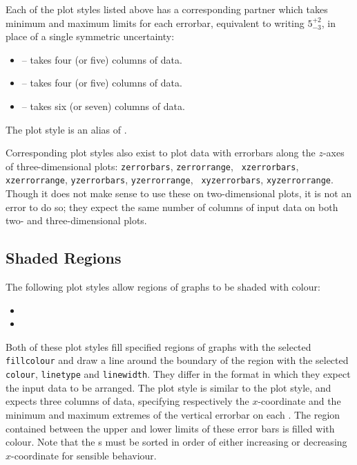 Each of the plot styles listed above has a corresponding partner which takes
minimum and maximum limits for each errorbar, equivalent to writing
$5^{+2}_{-3}$, in place of a single symmetric uncertainty:
\begin{itemize}
\item {} -- takes four (or five) columns of data.
\item {} -- takes four (or five) columns of data.
\item {} -- takes six (or seven) columns of data.
\end{itemize}
The plot style  is an alias of .

Corresponding plot styles also exist to plot data with errorbars along the
$z$-axes of three-dimensional plots: {\tt zerrorbars}, {\tt zerrorrange}, {\tt
xzerrorbars}, {\tt xzerrorrange}, {\tt yzerrorbars}, {\tt yzerrorrange}, {\tt
xyzerrorbars}, {\tt xyzerrorrange}. Though it does not make sense to use these
on two-dimensional plots, it is not an error to do so; they expect the same
number of columns of input data on both two- and three-dimensional plots.

\subsection{Shaded Regions}

The following plot styles allow regions of graphs to be shaded with colour:

\begin{itemize}
\item {}
\item {}
\end{itemize}

Both of these plot styles fill specified regions of graphs with the selected
{\tt fillcolour} and draw a line around the boundary of the region with the
selected {\tt colour}, {\tt linetype} and {\tt linewidth}. They differ in the
format in which they expect the input data to be arranged. The
 plot style is similar to the  plot
style, and expects three columns of data, specifying respectively the
$x$-coordinate and the minimum and maximum extremes of the vertical errorbar on
each \datapoint.  The region contained between the upper and lower limits of
these error bars is filled with colour.  Note that the \datapoint s must be
sorted in order of either increasing or decreasing $x$-coordinate for sensible
behaviour.

